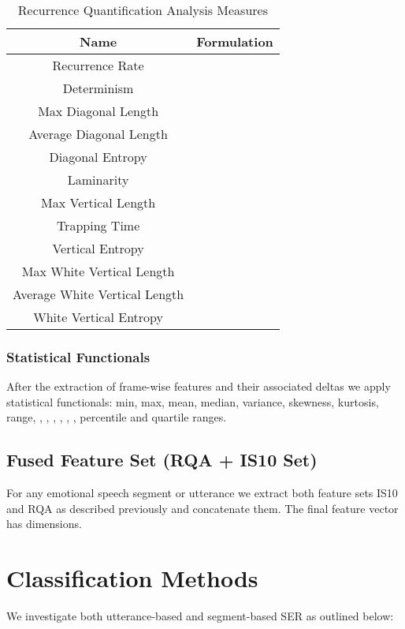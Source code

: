 \documentclass[a4paper]{article}
\begin{document}
\begin{table}[ht]
	\caption{Recurrence Quantification Analysis Measures}
    \label{t:RQAMeasures}
	\centering
    \renewcommand{\arraystretch}{1.6}


\begin{tabular}{|c|c|}
\hline
        \textbf{Name} & \textbf{Formulation} \\
        \hline
    	Recurrence Rate  &  \\
        Determinism &  \\
        Max Diagonal Length & 
          \\     
        Average Diagonal Length & 
          \\ 
        Diagonal Entropy &  \\
        Laminarity &  \\
        Max Vertical Length & 
          \\     
        Trapping Time & 
          \\ 
        Vertical Entropy &  \\
        Max White Vertical Length & 
          \\     
        Average White Vertical Length & 
          \\ 
        White Vertical Entropy &  \\
        \hline
	\end{tabular}
\end{table}

\subsubsection{Statistical Functionals}
\label{sect: RQA stats}
After the extraction of frame-wise features and their associated deltas we apply  statistical functionals: min, max, mean, median, variance, skewness, kurtosis, range,  , , , , , ,  percentile and  quartile ranges.     

\subsection{Fused Feature Set (RQA + IS10 Set)}
\label{sect:FusedFeatureSet}
For any emotional speech segment or utterance we extract both feature sets IS10 and RQA as described previously and concatenate them. The final feature vector has  dimensions. 

\section{Classification Methods}
\label{sect:ClassificationMethods}
We investigate both  utterance-based and  segment-based   SER  as outlined below: \vspace*{1mm} 
\end{document}
